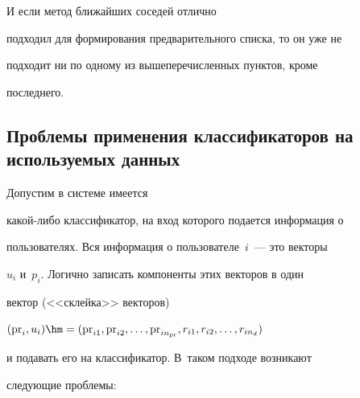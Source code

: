 И если метод ближайших соседей отлично


подходил для формирования предварительного списка, то он уже не


подходит ни по одному из вышеперечисленных пунктов, кроме


последнего.





\subsection{Проблемы применения классификаторов на используемых данных}


\label{sec:ClassificatorProblem} 





Допустим в системе имеется


ка\-кой-ли\-бо классификатор, на вход которого подается информация о


пользователях. Вся информация о пользователе~$i$~--- это векторы


$u_i$ и~$p_i.$ Логично записать компоненты этих векторов в один


вектор (<<склейка>> векторов)


$(\mathrm{pr}_i,u_i)\hm=(\mathrm{pr}_{i1},\mathrm{pr}_{i2},\ldots,\mathrm{pr}_{in_{\mathrm{pr}}},


r_{i1},r_{i2},\ldots,r_{in_d})$


и подавать его на классификатор. В~таком подходе возникают


следующие проблемы:


